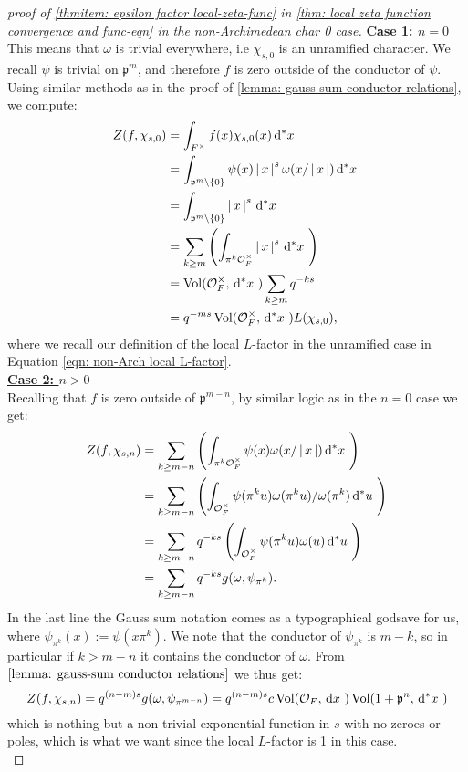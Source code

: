 \documentclass[11pt, x11names]{book}
\newcommand{\pp}{\mathfrak{p}}
\newcommand{\set}[1]{\left\{ #1 \right\}}
\renewcommand{\brack}[1]{\left(   #1 \right)}
\newcommand{\abs}[1]{\left| \, #1  \,\right|}
\newcommand{\dx}{\, \mathrm{d}x \ }
\renewcommand{\d}[1]{\, \mathrm{d}#1 \ }
\DeclareMathOperator{\vol}{Vol}
\begin{document}
\begin{proof}[proof of \ref{thmitem: epsilon factor local-zeta-func} in \ref{thm: local zeta function convergence and func-eqn} in the non-Archimedean char 0 case]
\underline{\textbf{Case 1: $n = 0$}}\\
This means that $\omega$ is trivial everywhere, i.e $\chi_{s, 0}$ is an unramified character. We recall $\psi$ is trivial on $\pp^m$, and therefore $f$ is zero outside of the conductor of $\psi$. Using similar methods as in the proof of \ref{lemma: gauss-sum conductor relations}, we compute:
\begin{align}
\label{eqn: local zeta function non-Arch unramified}
    Z(f, \chi_{s, 0}) &= \int_{F^\times} f(x)\chi_{s, 0}(x) \d{^*x} \nonumber \\
    &= \int_{\pp^m \setminus \set{0}} \psi(x) \abs{x}^s \omega(x/\abs{x}) \d{^*x} \nonumber \\
    &= \int_{\pp^m \setminus \set{0}} \abs{x}^s \d{^*x}\nonumber \\
    &= \sum_{k \geq m} \brack{\int_{\pi^k \calo_F^\times} \abs{x}^s \d{^*x}}\nonumber \\
    &= \vol(\calo_F^\times, \d{^*x}) \sum_{k \geq m} q^{-ks}\nonumber \\
    &= q^{-ms} \vol(\calo_F^\times, \d{^*x} ) L(\chi_{s, 0}),
\end{align}
where we recall our definition of the local $L$-factor in the unramified case in Equation \ref{eqn: non-Arch local L-factor}.\\

\underline{\textbf{Case 2: $n > 0$}}\\
Recalling that $f$ is zero outside of $\pp^{m-n}$, by similar logic as in the $n=0$ case we get:
\begin{align*}
    Z(f, \chi_{s, n}) &= \sum_{k \geq m-n} \brack{ \int_{\pi^k \calo_F^\times} \psi(x) \omega(x/\abs{x}) \d{^*x}}\\
    &= \sum_{k \geq m-n} \brack{ \int_{\calo_F^\times} \psi(\pi^k u) \omega(\pi^k u)/\omega(\pi^k) \d{^*u}}\\
    &= \sum_{k \geq m-n} q^{-ks} \brack{\int_{\calo_F^\times} \psi(\pi^k u) \omega(u) \d{^*u}}\\
    &= \sum_{k \geq m-n}q^{-ks}g(\omega, \psi_{\pi^k}).
\end{align*}
In the last line the Gauss sum notation comes as a typographical godsave for us, where $\psi_{\pi^k}(x) := \psi(x \pi^k)$. We note that the conductor of $\psi_{\pi^k}$ is $m-k$, so in particular if $k > m - n$ it contains the conductor of $\omega$. From $\ref{lemma: gauss-sum conductor relations}$ we thus get:
\begin{equation}
\label{eqn: local zeta function non-Arch ramified}
    Z(f, \chi_{s, n}) = q^{(n-m)s} g(\omega, \psi_{\pi^{m-n}}) = q^{(n-m)s} c \vol(\calo_F, \dx) \vol(1 + \pp^n, \d{^*x})
\end{equation}
which is nothing but a non-trivial exponential function in $s$ with no zeroes or poles, which is what we want since the local $L$-factor is 1 in this case.\\


\end{proof}
\end{document}
